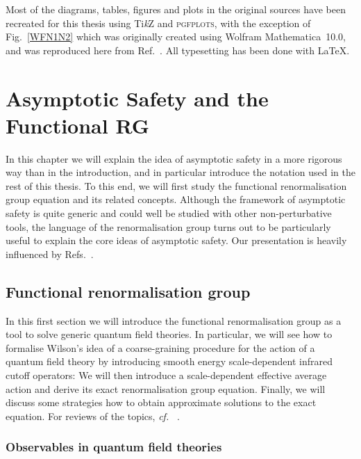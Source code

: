 \documentclass[11pt]{book}
\newcommand{\TikZ}{Ti\emph{k}Z }
\newcommand{\pgfplots}{\textsc{pgfplots}}
\newcommand\cf{\textit{cf.}\ }
\numberwithin{equation}{chapter}
\begin{document}
Most of the diagrams, tables, figures and plots in the original
sources have been recreated for this thesis using \TikZ and \pgfplots, with the exception
of Fig.~\ref{WFN1N2} which was originally created using Wolfram Mathematica~10.0,
and was reproduced here from Ref.~\cite{Labus:2015ska}.
All typesetting has been done with \LaTeX.



\mainmatter
\chapter[Asymptotic Safety and the Functional Renormalisation Group]{Asymptotic Safety and the Functional RG}

In this chapter we will explain the idea of asymptotic safety in a
more rigorous way than in the introduction,
and in particular introduce the notation
used in the rest of this thesis.
To this end, we will first study the functional renormalisation group
equation and its related concepts.
Although the framework of asymptotic safety is quite generic
and could well be studied with other non-perturbative tools, the
language of the renormalisation group turns out to be particularly useful
to explain the core ideas of asymptotic safety.
Our presentation is heavily influenced by
Refs.~\cite{Percacci:2011fr, percacci2017introduction}.

\section{Functional renormalisation group}

In this first section we will introduce the functional renormalisation group as
a tool to solve generic quantum field theories. In particular, we will see how to
formalise Wilson's idea of a coarse-graining procedure for the action
of a quantum field theory by introducing smooth energy scale-dependent
infrared cutoff operators: We will then introduce a scale-dependent
effective average action and derive its exact renormalisation group equation.
Finally, we will discuss some strategies how to obtain approximate solutions
to the exact equation. For reviews of the topics, \cf
\cite{
  Berges:2000ew,
  Aoki:2000wm,
  Pawlowski:2005xe,
  Gies:2006wv,
  Rosten:2010vm
}.


\subsection{Observables in quantum field theories}
\end{document}
